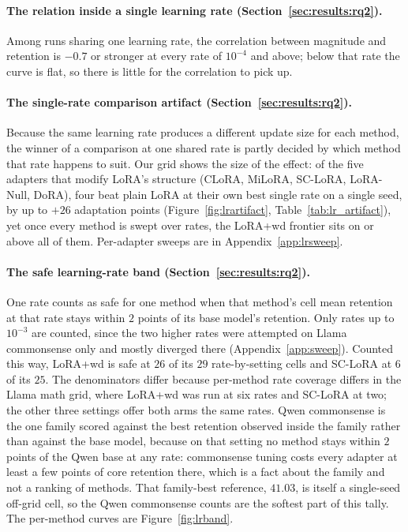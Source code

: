 \documentclass[11pt]{article}
\begin{document}
\paragraph{The relation inside a single learning rate
(Section~\ref{sec:results:rq2}).} Among runs sharing one learning rate, the
correlation between magnitude and retention is $-0.7$ or stronger at every
rate of $10^{-4}$ and above; below that rate the curve is flat, so there is
little for the correlation to pick up.

\paragraph{The single-rate comparison artifact
(Section~\ref{sec:results:rq2}).} Because the same learning rate produces a
different update size for each method, the winner of a comparison at one
shared rate is partly decided by which method that rate happens to suit. Our
grid shows the size of the effect: of the five adapters that modify LoRA's
structure (CLoRA, MiLoRA, SC-LoRA, LoRA-Null, DoRA), four beat plain LoRA at
their own best single rate on a single seed, by up to $+26$ adaptation
points (Figure~\ref{fig:lrartifact}, Table~\ref{tab:lr_artifact}), yet once
every method is swept over rates, the LoRA{+}wd frontier sits on or above
all of them. Per-adapter sweeps are in Appendix~\ref{app:lrsweep}.

\paragraph{The safe learning-rate band
(Section~\ref{sec:results:rq2}).} One rate counts as safe for one method when
that method's cell mean retention at that rate stays within $2$ points of its
base model's retention. Only rates up to $10^{-3}$ are counted, since the two
higher rates were attempted on Llama commonsense only and mostly diverged there
(Appendix~\ref{app:sweep}). Counted this
way, LoRA{+}wd is safe at $26$ of its $29$ rate-by-setting cells and SC-LoRA at
$6$ of its $25$. The denominators differ because per-method rate coverage
differs in the Llama math grid, where LoRA{+}wd was run at six rates and
SC-LoRA at two; the other three settings offer both arms the same rates.
Qwen commonsense is the one family scored against
the best retention observed inside the family rather than against the base
model, because on that setting no method stays within $2$ points of the Qwen
base at any rate: commonsense tuning costs every adapter at least a few points
of core retention there, which is a fact about the family and not a ranking of
methods. That family-best reference, $41.03$, is itself a single-seed
off-grid cell, so the Qwen commonsense counts are the softest part of this
tally. The per-method curves are Figure~\ref{fig:lrband}.
\end{document}

